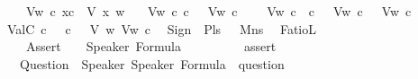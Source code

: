 \begin{isabellebody}
\ \ \ \ {\isachardoublequoteopen}V{\isacharcomma}{\kern0pt}w\ {\isasymTurnstile}\isactrlsup c\ x\isactrlsup c\ {\isacharequal}{\kern0pt}\ V\ x\ w{\isachardoublequoteclose}\isanewline
\ \ {\isacharbar}{\kern0pt}\ {\isachardoublequoteopen}V{\isacharcomma}{\kern0pt}w\ {\isasymTurnstile}\isactrlsup c\ {\isasymnot}\isactrlsup c{\isasymphi}\ {\isacharequal}{\kern0pt}\ {\isacharparenleft}{\kern0pt}{\isasymnot}\ V{\isacharcomma}{\kern0pt}w\ {\isasymTurnstile}\isactrlsup c\ {\isasymphi}{\isacharparenright}{\kern0pt}{\isachardoublequoteclose}\isanewline
\ \ {\isacharbar}{\kern0pt}\ {\isachardoublequoteopen}V{\isacharcomma}{\kern0pt}w\ {\isasymTurnstile}\isactrlsup c\ {\isasymphi}\ {\isasymsupset}\isactrlsup c\ {\isasympsi}\ {\isacharequal}{\kern0pt}\ {\isacharparenleft}{\kern0pt}V{\isacharcomma}{\kern0pt}w\ {\isasymTurnstile}\isactrlsup c\ {\isasymphi}\ {\isasymlongrightarrow}\ V{\isacharcomma}{\kern0pt}w\ {\isasymTurnstile}\isactrlsup c\ {\isasympsi}{\isacharparenright}{\kern0pt}{\isachardoublequoteclose}\isanewline
\isanewline
{}\isamarkupfalse%
\ ValC\ {\isacharparenleft}{\kern0pt}{\isachardoublequoteopen}{\isasymTurnstile}\isactrlsup c\ {\isacharunderscore}{\kern0pt}{\isachardoublequoteclose}{\isacharparenright}{\kern0pt}\ \ {\isachardoublequoteopen}{\isasymTurnstile}\isactrlsup c\ {\isasymphi}\ {\isasymequiv}\ {\isasymforall}V\ w{\isachardot}{\kern0pt}\ V{\isacharcomma}{\kern0pt}w\ {\isasymTurnstile}\isactrlsup c\ {\isasymphi}{\isachardoublequoteclose}%
\isadelimdocument
%
\endisadelimdocument
%
\isatagdocument
%
\isamarkuptrue%
%
\endisatagdocument
{\isafolddocument}%
%
\isadelimdocument
%
\endisadelimdocument
{}\isamarkupfalse%
\ Sign\ {\isacharequal}{\kern0pt}\ Pls\ {\isacharparenleft}{\kern0pt}{\isachardoublequoteopen}{\isasymoplus}{\isachardoublequoteclose}{\isacharparenright}{\kern0pt}\ {\isacharbar}{\kern0pt}\ Mns\ {\isacharparenleft}{\kern0pt}{\isachardoublequoteopen}{\isasymominus}{\isachardoublequoteclose}{\isacharparenright}{\kern0pt}\isanewline
{}\isamarkupfalse%
\ FatioL\ {\isacharequal}{\kern0pt}\isanewline
\ \ \ \ Assert\ \ \ \ Speaker\ Formula\ \ \ \ \ \ \ \ \ \ {\isacharparenleft}{\kern0pt}{\isachardoublequoteopen}assert{\isacharbrackleft}{\kern0pt}{\isacharunderscore}{\kern0pt}{\isacharcomma}{\kern0pt}{\isacharunderscore}{\kern0pt}{\isacharbrackright}{\kern0pt}{\isachardoublequoteclose}{\isacharparenright}{\kern0pt}\isanewline
\ \ {\isacharbar}{\kern0pt}\ Question\ \ Speaker\ Speaker\ Formula\ \ {\isacharparenleft}{\kern0pt}{\isachardoublequoteopen}question{\isacharbrackleft}{\kern0pt}{\isacharunderscore}{\kern0pt}{\isacharcomma}{\kern0pt}{\isacharunderscore}{\kern0pt}{\isacharcomma}{\kern0pt}{\isacharunderscore}{\kern0pt}{\isacharbrackright}{\kern0pt}{\isachardoublequoteclose}{\isacharparenright}{\kern0pt}\isanewline

\end{isabellebody}
